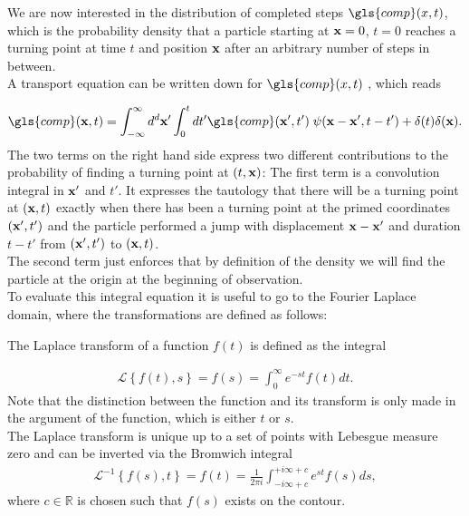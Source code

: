 We are now interested in the distribution of completed steps $\gls{comp}(x,t)$, which is the probability density that a particle starting at $\mathbf{ x }=0$, $t=0$ reaches a turning point at time $t$ and position $\mathbf{ x }$ after an arbitrary number of steps in between. \\
A transport equation can be written down for $\gls{comp}(x,t)$ \cite{firstSteps}, which reads

\begin{align}
\gls{comp}(\ve{x},t) = \int_{-\infty}^{\infty} d^{d}\ve{x}' \int_{0}^{t} dt' \gls{comp}(\ve{x}',t')  \; \psi(\ve{x}-\ve{x}',t-t') + \delta(t) \delta(\ve{x}) . \label{eqn:CTransport}
\end{align}
%
The two terms on the right hand side express two different contributions to the probability of finding a turning point at $(t,\mathbf{ x })$: The first term is a convolution integral in $\mathbf{ x' }$ and $t'$. It expresses the tautology that there will be a turning point at $(\mathbf{ x },t)$ exactly when there has been a turning point at the primed coordinates $(\mathbf{ x' },t')$ and the particle performed a jump with displacement $\mathbf{ x }-\mathbf{ x }'$ and duration $t-t'$ from $(\mathbf{ x' },t')$ to $(\mathbf{ x },t)$.  \\
The second term just enforces that by definition of the density we will find the particle at the origin at the beginning of observation. \\
To evaluate this integral equation it is useful to go to the Fourier Laplace domain, where the transformations are defined as follows:

The Laplace transform of a function $f(t)$ is defined as the integral 

\begin{align}
\mathcal{L} \left\{ f(t), s \right\} = f(s) = \int^{\infty}_{0} e^{-st} f(t) dt .
\end{align}
%
Note that the distinction between the function and its transform is only made in the argument of the function, which is either $t$ or $s$. \\
The Laplace transform is unique up to a set of points with Lebesgue measure zero and can be inverted via the Bromwich integral 
%
\begin{align}
\mathcal{L}^{-1} \left\{ f(s), t \right\} = f(t) = \frac{1}{2 \pi i} \int^{+i \infty + c}_{-i \infty + c} e^{st} f(s) ds, 
\end{align}
%
where $c \in \mathbb{R}$ is chosen such that $f(s)$ exists on the contour. 

